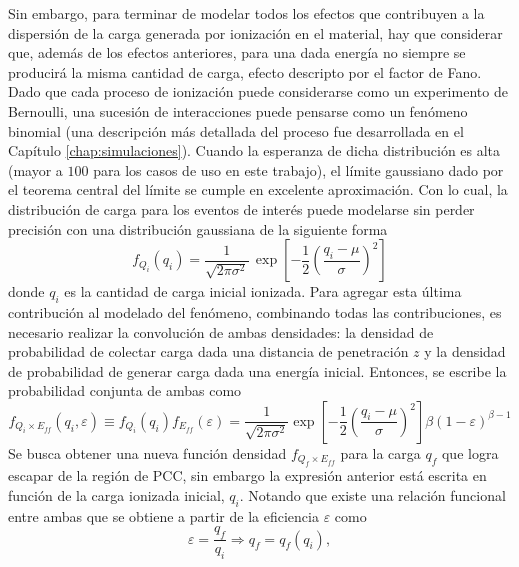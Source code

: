 Sin embargo, para terminar de modelar todos los efectos que contribuyen a la dispersión de la carga generada por ionización en el material, hay que considerar que, además de los efectos anteriores, para una dada energía no siempre se producirá la misma cantidad de carga, efecto descripto por el factor de Fano. Dado que cada proceso de ionización puede considerarse como un experimento de Bernoulli, una sucesión de interacciones puede pensarse como un fenómeno binomial (una descripción más detallada del proceso fue desarrollada en el Capítulo \ref{chap:simulaciones}). Cuando la esperanza de dicha distribución es alta (mayor a $100$ para los casos de uso en este trabajo), el límite gaussiano dado por el teorema central del límite se cumple en excelente aproximación. Con lo cual, la distribución de carga para los eventos de interés puede modelarse sin perder precisión con una distribución gaussiana de la siguiente forma
\begin{equation*}
    f_{Q_{i}}(q_{i}) = 
    \frac{1}{\sqrt{2\pi \sigma^{2}}}\,
    \exp
        \left[
            -\frac{1}{2}
            \left(
                \frac{q_{i} - \mu}{\sigma}
            \right)^{2}
        \right]
\end{equation*}
donde $q_{i}$ es la cantidad de carga inicial ionizada. Para agregar esta última contribución al modelado del fenómeno, combinando todas las contribuciones, es necesario realizar la convolución de ambas densidades: la densidad de probabilidad de colectar carga dada una distancia de penetración $z$ y la densidad de probabilidad de generar carga dada una energía inicial. Entonces, se escribe la probabilidad conjunta de ambas como
\begin{equation*}
    f_{Q_{i} \times E_{ff}} (q_{i}, \varepsilon)
    \equiv f_{Q_{i}}(q_{i}) f_{E_{ff}}(\varepsilon)
    =
    \frac{1}{\sqrt{2\pi \sigma^{2}}}
    \exp
        \left[
            -\frac{1}{2}
            \left(
                \frac{q_{i} - \mu}{\sigma}
            \right)^{2}
        \right]
    \beta(1-\varepsilon)^{\beta - 1}
\end{equation*}
Se busca obtener una nueva función densidad $f_{Q_{f}\times E_{ff}}$ para la carga $q_{f}$ que logra escapar de la región de PCC, sin embargo la expresión anterior está escrita en función de la carga ionizada inicial, $q_{i}$. Notando que existe una relación funcional entre ambas que se obtiene a partir de la eficiencia $\varepsilon$ como
\begin{equation*}
    \varepsilon = \frac{q_{f}}{q_{i}}
    \Longrightarrow
    q_{f} = q_{f}(q_{i}),
\end{equation*}
